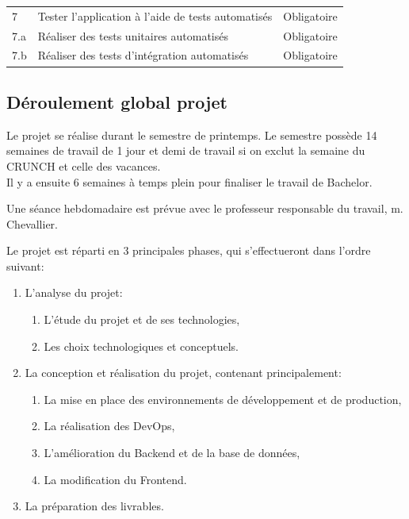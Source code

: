 \documentclass[
    iai, %
    il, %
]{heig-tb}
\begin{document}
\begin{table}[h]
\begin{center}
\begin{tabularx}{1.0\textwidth} {l|X|r}
            7   & Tester l'application à l'aide de tests automatisés                                                                     & Obligatoire   \\
            7.a & Réaliser des tests unitaires automatisés                                                                               & Obligatoire   \\
            7.b & Réaliser des tests d'intégration automatisés                                                                           & Obligatoire   \\
        \end{tabularx}
    \end{center}
\end{table}

\newpage
\subsection{Déroulement global projet}

Le projet se réalise durant le semestre de printemps. Le semestre possède 14 semaines de travail de 1 jour et demi de travail si on exclut la semaine du CRUNCH et celle des vacances.\\
Il y a ensuite 6 semaines à temps plein pour finaliser le travail de Bachelor.

Une séance hebdomadaire est prévue avec le professeur responsable du travail, m. Chevallier.

Le projet est réparti en 3 principales phases, qui s'effectueront dans l'ordre suivant:
\begin{enumerate}
    \def\labelenumi{\arabic{enumi}.}
    \item L'analyse du projet:
          \begin{enumerate}
              \def\labelenumii{\alph{enumii}.}
              \item L'étude du projet et de ses technologies,
              \item Les choix technologiques et conceptuels.
          \end{enumerate}
    \item La conception et réalisation du projet, contenant principalement:
          \begin{enumerate}
              \def\labelenumii{\alph{enumii}.}
              \item La mise en place des environnements de développement et de production,
              \item La réalisation des DevOps,
              \item L'amélioration du Backend et de la base de données,
              \item La modification du Frontend.
          \end{enumerate}
    \item La préparation des livrables.
\end{enumerate}
\end{document}
